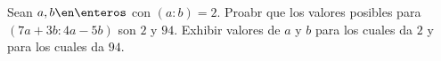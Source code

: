 \begin{enunciado}{\ejercicio}
Sean $a, b \en \enteros$ con $(a:b) = 2$. Proabr que los valores posibles para
$(7a + 3b: 4a - 5b)$ son $2$ y $94$. Exhibir valores de $a$ y $b$ para los cuales da $2$ y para los cuales da $94$.
\end{enunciado}

\hacer